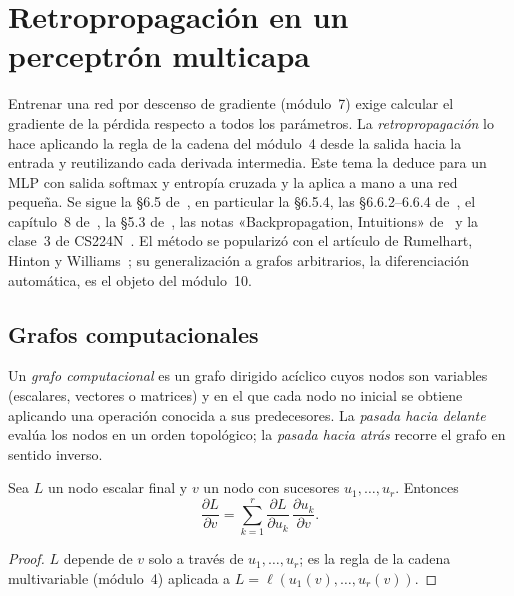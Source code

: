 \chapter{Retropropagación en un perceptrón multicapa}
\label{tema:5}

Entrenar una red por descenso de gradiente (módulo~7) exige calcular el gradiente de la pérdida respecto a todos los parámetros. La \emph{retropropagación} lo hace aplicando la regla de la cadena del módulo~4 desde la salida hacia la entrada y reutilizando cada derivada intermedia. Este tema la deduce para un MLP con salida softmax y entropía cruzada y la aplica a mano a una red pequeña. Se sigue la §6.5 de~\cite{gbc}, en particular la §6.5.4, las §6.6.2--6.6.4 de~\cite{jm3}, el capítulo~8 de~\cite{bishopdl}, la §5.3 de~\cite{d2l}, las notas «Backpropagation, Intuitions» de~\cite{cs231n} y la clase~3 de CS224N~\cite{cs224n}. El método se popularizó con el artículo de Rumelhart, Hinton y Williams~\cite{rumelhart}; su generalización a grafos arbitrarios, la diferenciación automática, es el objeto del módulo~10.

\section{Grafos computacionales}

\begin{definicion}
Un \emph{grafo computacional} es un grafo dirigido acíclico cuyos nodos son variables (escalares, vectores o matrices) y en el que cada nodo no inicial se obtiene aplicando una operación conocida a sus predecesores. La \emph{pasada hacia delante} evalúa los nodos en un orden topológico; la \emph{pasada hacia atrás} recorre el grafo en sentido inverso.
\end{definicion}

\begin{proposicion}\label{prop:cadena-grafo}
Sea $L$ un nodo escalar final y $v$ un nodo con sucesores $u_1,\dots,u_r$. Entonces
\[
\frac{\partial L}{\partial v}=\sum_{k=1}^{r}\frac{\partial L}{\partial u_k}\,\frac{\partial u_k}{\partial v}.
\]
\end{proposicion}

\begin{proof}
$L$ depende de $v$ solo a través de $u_1,\dots,u_r$; es la regla de la cadena multivariable (módulo~4) aplicada a $L=\ell(u_1(v),\dots,u_r(v))$.
\end{proof}

